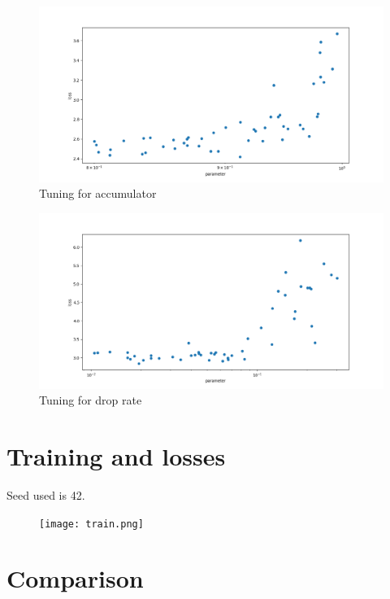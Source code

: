 \documentclass{article}
\begin{document}
\begin{figure}[H]
	\centering
	\includegraphics[width=\textwidth]{accu.png}
	\caption{Tuning for accumulator}
\end{figure}

\begin{figure}[H]
	\centering
	\includegraphics[width=\textwidth]{drop.png}
	\caption{Tuning for drop rate}
\end{figure}

\section{Training and losses}

Seed used is 42.

\begin{figure}[H]
	\centering
	\texttt{[image: train.png]}
\end{figure}

\section{Comparison}
\end{document}
